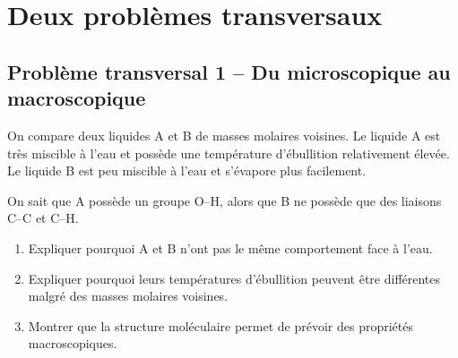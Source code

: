 \documentclass[11pt,a4paper]{article}
\begin{document}
\section{Deux problèmes transversaux}

\subsection{Problème transversal 1 -- Du microscopique au macroscopique}

\begin{enoncebox}
On compare deux liquides A et B de masses molaires voisines.  
Le liquide A est très miscible à l'eau et possède une température d'ébullition relativement élevée.  
Le liquide B est peu miscible à l'eau et s'évapore plus facilement.

On sait que A possède un groupe O--H, alors que B ne possède que des liaisons C--C et C--H.

\begin{enumerate}[label=\arabic*)]
    \item Expliquer pourquoi A et B n'ont pas le même comportement face à l'eau.
    \item Expliquer pourquoi leurs températures d'ébullition peuvent être différentes malgré des masses molaires voisines.
    \item Montrer que la structure moléculaire permet de prévoir des propriétés macroscopiques.
\end{enumerate}
\end{enoncebox}
\end{document}
